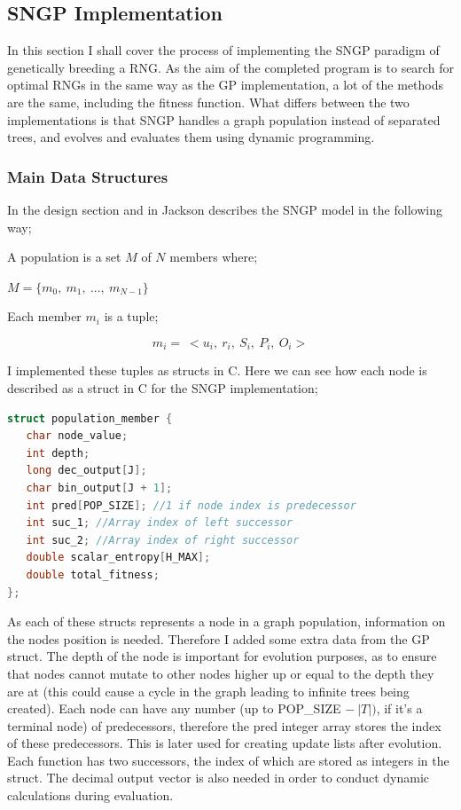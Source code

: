 \documentclass[a4paper,10.5pt]{article}
\begin{document}
\subsection{SNGP Implementation}
In this section I shall cover the process of implementing the SNGP paradigm of genetically breeding a RNG. As the aim of the completed program is to search for optimal RNGs in the same way as the GP implementation, a lot of the methods are the same, including the fitness function. What differs between the two implementations is that SNGP handles a graph population instead of separated trees, and evolves and evaluates them using dynamic programming.

\subsubsection{Main Data Structures}
 In the design section and in \cite[p.50-51]{jacksonsngp2} Jackson describes the SNGP model in the following way;

A population is a set $M$ of $N$ members where;
\begin{center}
$M = \{m_0,\ m_1,\ ...,\ m_{N-1}\}$
\end{center}
Each member $m_i$ is a tuple;

\begin{equation*}
m_i = \ <u_i,\ r_i,\ S_i,\ P_i,\ O_i>
\end{equation*}

I implemented these tuples as structs in C. Here we can see how each node is described as a struct in C for the SNGP implementation;

\begin{lstlisting}[language=C]
struct population_member {
   char node_value;
   int depth;
   long dec_output[J];
   char bin_output[J + 1];
   int pred[POP_SIZE]; //1 if node index is predecessor
   int suc_1; //Array index of left successor
   int suc_2; //Array index of right successor 
   double scalar_entropy[H_MAX];
   double total_fitness;
};
\end{lstlisting}

As each of these structs represents a node in a graph population, information on the nodes position is needed. Therefore I added some extra data from the GP struct. The depth of the node is important for evolution purposes, as to ensure that nodes cannot mutate to other nodes higher up or equal to the depth they are at (this could cause a cycle in the graph leading to infinite trees being created). Each node can have any number (up to POP\_SIZE $-\ |T|)$, if it's a terminal node) of predecessors, therefore the pred integer array stores the index of these predecessors. This is later used for creating update lists after evolution. Each function has two successors, the index of which are stored as integers in the struct. The decimal output vector is also needed in order to conduct dynamic calculations during evaluation.
\end{document}
